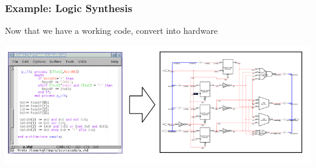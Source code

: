 \documentclass[compress]{beamer}
\begin{document}
\begin{frame}
	\frametitle{Example: Logic Synthesis}
	Now that we have a working code, convert into hardware
	\begin{center}
		\includegraphics[width=\textwidth]{synth}
	\end{center}
\end{frame}		
\end{document}

